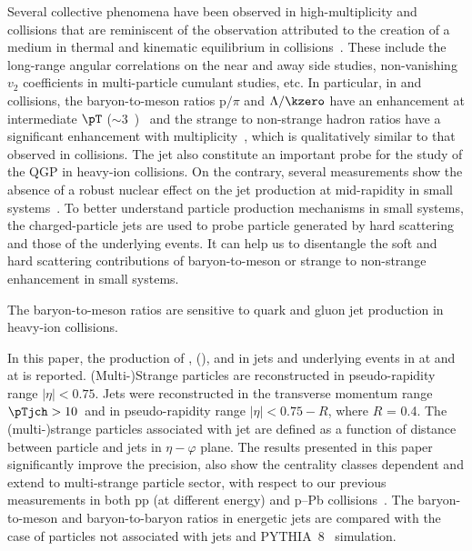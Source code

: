 \documentclass[ALICE,manyauthors]{cernphprep}
\begin{document}
Several collective phenomena have been observed in high-multiplicity \pp and \pPb collisions that are reminiscent of the observation attributed to the creation of a medium in thermal and kinematic equilibrium in \PbPb collisions~\cite{Acharya:2019vdf, Aad:2015gqa, Abelev:2012ola, ABELEV:2013wsa, Khachatryan:2015waa, Abelev:2014uua, Adam:2015vsf}.
These include the long-range angular correlations on the near and away side studies, non-vanishing $v_{2}$ coefficients in multi-particle cumulant studies, etc.
In particular, in \pp and \pPb collisions, the baryon-to-meson ratios p$/\pi$ and $\Lambda/\kzero$ have an enhancement at intermediate $\pT$ ($\sim 3$~\GeVc)~\cite{Acharya:2018orn, Khachatryan:2016yru, Abelev:2013xaa, ALICE:2017jyt} and the strange to non-strange hadron ratios have a significant enhancement with multiplicity~\cite{Abelev:2013haa, ALICE:2017jyt, Khachatryan:2016yru}, which is qualitatively similar to that observed in \PbPb collisions.
The jet also constitute an important probe for the study of the QGP in heavy-ion collisions. 
On the contrary, several measurements show the absence of a robust nuclear effect on the jet production at mid-rapidity in small systems~\cite{Acharya:2019jyg, Acharya:2019tku, ALICE:2014dla, Abelev:2013fn, Acharya:2018eat, Acharya:2017okq, Adam:2015xea, Adam:2016jfp}.
To better understand particle production mechanisms in small systems, the charged-particle jets are used to probe particle generated by hard scattering and those of the underlying events.
It can help us to disentangle the soft and hard scattering contributions of baryon-to-meson or strange to non-strange enhancement in small systems. 

The baryon-to-meson ratios are sensitive to quark and gluon jet production in heavy-ion collisions.

In this paper, the production of \kzero, \lmb (\almb), \Xis and \Oms in jets and underlying events in \pp at \thirteen and \pPb at \fivenn is reported.
(Multi-)Strange particles are reconstructed in pseudo-rapidity range $|\eta| < 0.75$.
Jets were reconstructed in the transverse momentum range $\pTjch > 10$~\GeVc and in pseudo-rapidity range $|\eta| < 0.75 - R$, where $R$ = 0.4.
The (multi-)strange particles associated with jet are defined as a function of distance between particle and jets in $\eta-\varphi$ plane.
The results presented in this paper significantly improve the precision, also show the centrality classes dependent and extend to multi-strange particle sector, with respect to our previous measurements in both pp (at different energy) and p–Pb collisions~\cite{V0injet}.
The baryon-to-meson and baryon-to-baryon ratios in energetic jets are compared with the case of particles not associated with jets and PYTHIA~8~\cite{Sjostrand:2014zea} simulation.
\end{document}
